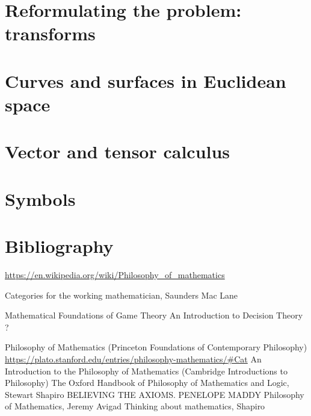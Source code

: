 \documentclass{report}
\begin{document}
\chapter{Reformulating the problem: transforms}




\chapter{Curves and surfaces in Euclidean space}

\chapter{Vector and tensor calculus}





\appendix

\chapter{Symbols}


\listoftheorems[title={List of named results}, swapnumber,ignoreall,onlynamed]



\chapter{Bibliography}

\url{https://en.wikipedia.org/wiki/Philosophy_of_mathematics}

Categories for the working mathematician, Saunders Mac Lane

Mathematical Foundations of Game Theory
An Introduction to Decision Theory ?

Philosophy of Mathematics (Princeton Foundations of Contemporary Philosophy)
\url{https://plato.stanford.edu/entries/philosophy-mathematics/#Cat}
An Introduction to the Philosophy of Mathematics (Cambridge Introductions to Philosophy)
The Oxford Handbook of Philosophy of Mathematics and Logic, Stewart Shapiro
BELIEVING THE AXIOMS. PENELOPE MADDY
Philosophy of Mathematics, Jeremy Avigad
Thinking about mathematics, Shapiro
\end{document}
